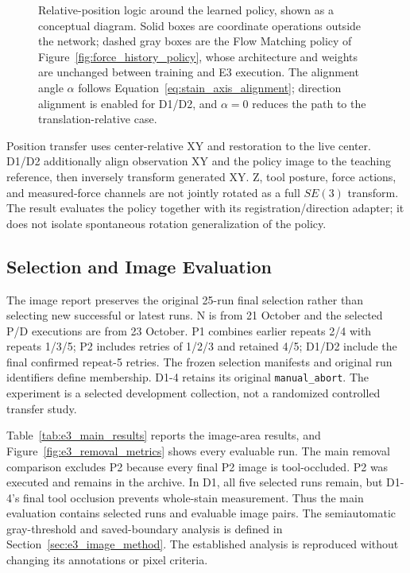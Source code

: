 \begin{figure}[tbp]
{}
\caption[Relative-position learning and placement transfer]{Relative-position logic around the learned policy, shown as a conceptual diagram. Solid boxes are coordinate operations outside the network; dashed gray boxes are the Flow Matching policy of Figure~\ref{fig:force_history_policy}, whose architecture and weights are unchanged between training and E3 execution. The alignment angle \(\alpha\) follows Equation~\eqref{eq:stain_axis_alignment}; direction alignment is enabled for D1/D2, and \(\alpha=0\) reduces the path to the translation-relative case.}
\label{fig:relative_position_logic}
\end{figure}

Position transfer uses center-relative XY and restoration to the live center. D1/D2 additionally align observation XY and the policy image to the teaching reference, then inversely transform generated XY. Z, tool posture, force actions, and measured-force channels are not jointly rotated as a full \(SE(3)\) transform. The result evaluates the policy together with its registration/direction adapter; it does not isolate spontaneous rotation generalization of the policy.

\subsection{Selection and Image Evaluation}
The image report preserves the original 25-run final selection rather than selecting new successful or latest runs. N is from 21 October and the selected P/D executions are from 23 October. P1 combines earlier repeats 2/4 with repeats 1/3/5; P2 includes retries of 1/2/3 and retained 4/5; D1/D2 include the final confirmed repeat-5 retries. The frozen selection manifests and original run identifiers define membership. D1-4 retains its original \texttt{manual\_abort}. The experiment is a selected development collection, not a randomized controlled transfer study.

Table~\ref{tab:e3_main_results} reports the image-area results, and Figure~\ref{fig:e3_removal_metrics} shows every evaluable run. The main removal comparison excludes P2 because every final P2 image is tool-occluded. P2 was executed and remains in the archive. In D1, all five selected runs remain, but D1-4's final tool occlusion prevents whole-stain measurement. Thus the main evaluation contains \EthreeMainN{} selected runs and \EthreeImageN{} evaluable image pairs. The semiautomatic gray-threshold and saved-boundary analysis is defined in Section~\ref{sec:e3_image_method}. The established analysis is reproduced without changing its annotations or pixel criteria.

